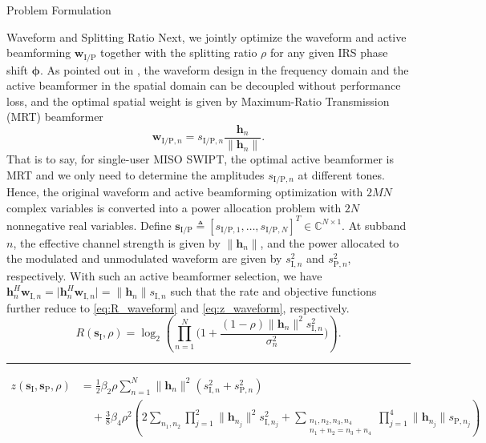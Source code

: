 \documentclass[journal]{IEEEtran}
\begin{document}
\begin{section}{Problem Formulation}
		\begin{subsection}{Waveform and Splitting Ratio}
			Next, we jointly optimize the waveform and active beamforming $\boldsymbol{w}_{\mathrm{I/P}}$ together with the splitting ratio $\rho$ for any given IRS phase shift $\boldsymbol{\phi}$. As pointed out in \cite{Clerckx2018b}, the waveform design in the frequency domain and the active beamformer in the spatial domain can be decoupled without performance loss, and the optimal spatial weight is given by Maximum-Ratio Transmission (MRT) beamformer
			\begin{equation}\label{eq:w_IP}
				\boldsymbol{w}_{\mathrm{I/P},n}=s_{\mathrm{I/P},n}\frac{\boldsymbol{h}_n}{\lVert{\boldsymbol{h}_n}\rVert}.
			\end{equation}
			That is to say, for single-user MISO SWIPT, the optimal active beamformer is MRT and we only need to determine the amplitudes $s_{\mathrm{I/P},n}$ at different tones. Hence, the original waveform and active beamforming optimization with $2MN$ complex variables is converted into a power allocation problem with $2N$ nonnegative real variables. Define $\boldsymbol{s}_{\mathrm{I/P}} \triangleq [s_{\mathrm{I/P},1},\dots,s_{\mathrm{I/P},N}]^T \in \mathbb{C}^{N \times 1}$. At subband $n$, the effective channel strength is given by $\lVert{\boldsymbol{h}_n}\rVert$, and the power allocated to the modulated and unmodulated waveform are given by $s_{\mathrm{I},n}^2$ and $s_{\mathrm{P},n}^2$, respectively. With such an active beamformer selection, we have $\boldsymbol{h}_n^H\boldsymbol{w}_{\mathrm{I},n}=\lvert{\boldsymbol{h}_n^H\boldsymbol{w}_{\mathrm{I},n}}\rvert=\lVert{\boldsymbol{h}_n}\rVert s_{\mathrm{I},n}$ such that the rate and objective functions further reduce to \eqref{eq:R_waveform} and \eqref{eq:z_waveform}, respectively.
			\begin{equation}\label{eq:R_waveform}
				R(\boldsymbol{s}_{\mathrm{I}},\rho) = \log_2\left(\prod_{n=1}^N\biggl(1+\frac{(1-\rho)\lVert{\boldsymbol{h}_n}\rVert^2 s_{\mathrm{I},n}^2}{\sigma_n^2}\biggr)\right).
			\end{equation}
			\begin{figure*}[!b]
				\hrule
				\begin{align}
					z(\boldsymbol{s}_{\mathrm{I}},\boldsymbol{s}_\mathrm{P},\rho)
					& = \frac{1}{2}{\beta_2}{\rho} \sum_{n=1}^N \lVert{\boldsymbol{h}_n}\rVert^2(s_{\mathrm{I},n}^2+s_{\mathrm{P},n}^2)\nonumber\\
					& \quad + \frac{3}{8}{\beta_4}{\rho^2} \left( 2\sum_{n_1,n_2} \prod_{j=1}^2 \lVert{\boldsymbol{h}_{n_j}}\rVert^2 s_{\mathrm{I},{n_j}}^2 + \sum_{\substack{{n_1},{n_2},{n_3},{n_4}\\{n_1}+{n_2}={n_3}+{n_4}}} \prod_{j=1}^4 \lVert{\boldsymbol{h}_{n_j}}\rVert s_{\mathrm{P},{n_j}} \right)\nonumber\\

\end{align}
\end{figure*}
\end{subsection}
\end{section}
\end{document}
